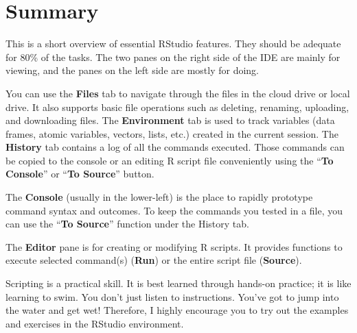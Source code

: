 \documentclass[
  letterpaper,
  DIV=11,
  numbers=noendperiod]{scrreprt}
\begin{document}
\section{Summary}\label{summary-3}

This is a short overview of essential RStudio features. They should be
adequate for 80\% of the tasks. The two panes on the right side of the
IDE are mainly for viewing, and the panes on the left side are mostly
for doing.

You can use the \textbf{Files} tab to navigate through the files in the
cloud drive or local drive. It also supports basic file operations such
as deleting, renaming, uploading, and downloading files. The
\textbf{Environment} tab is used to track variables (data frames, atomic
variables, vectors, lists, etc.) created in the current session. The
\textbf{History} tab contains a log of all the commands executed. Those
commands can be copied to the console or an editing R script file
conveniently using the ``\textbf{To Console}'' or ``\textbf{To Source}''
button.

The \textbf{Console} (usually in the lower-left) is the place to rapidly
prototype command syntax and outcomes. To keep the commands you tested
in a file, you can use the ``\textbf{To Source}'' function under the
History tab.

The \textbf{Editor} pane is for creating or modifying R scripts. It
provides functions to execute selected command(s) (\textbf{Run}) or the
entire script file (\textbf{Source}).

Scripting is a practical skill. It is best learned through hands-on
practice; it is like learning to swim. You don't just listen to
instructions. You've got to jump into the water and get wet! Therefore,
I highly encourage you to try out the examples and exercises in the
RStudio environment.



\end{document}
